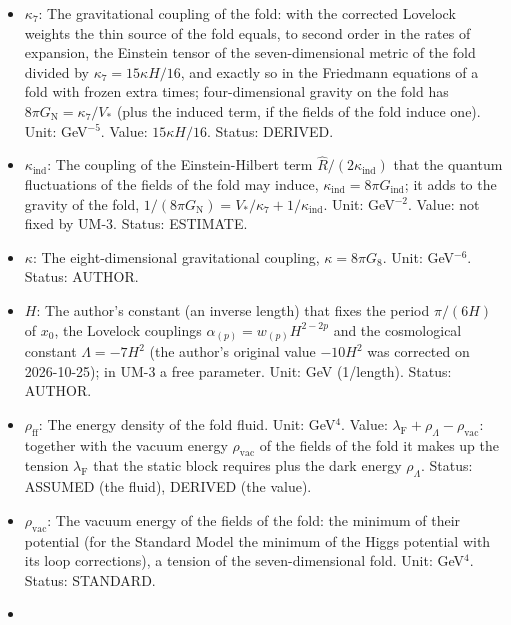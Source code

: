\documentclass[
  10pt,
]{article}
\begin{document}
\begin{itemize}
  \(\mathrm{e}^{-a_4}b_4\) is constant; it converts the
  eight-dimensional normalisation into the four-dimensional one. Unit:
  length\(^3\) (GeV\(^{-3}\)). Status: ASSUMED.
\item
  \(\kappa_7\): The gravitational coupling of the fold: with the
  corrected Lovelock weights the thin source of the fold equals, to
  second order in the rates of expansion, the Einstein tensor of the
  seven-dimensional metric of the fold divided by
  \(\kappa_7 = 15\kappa H/16\), and exactly so in the Friedmann
  equations of a fold with frozen extra times; four-dimensional gravity
  on the fold has \(8\pi G_{\mathrm{N}} = \kappa_7/V_*\) (plus the
  induced term, if the fields of the fold induce one). Unit:
  GeV\(^{-5}\). Value: \(15\kappa H/16\). Status: DERIVED.
\item
  \(\kappa_{\mathrm{ind}}\): The coupling of the Einstein-Hilbert term
  \(\hat R/(2\kappa_{\mathrm{ind}})\) that the quantum fluctuations of
  the fields of the fold may induce,
  \(\kappa_{\mathrm{ind}} = 8\pi G_{\mathrm{ind}}\); it adds to the
  gravity of the fold,
  \(1/(8\pi G_{\mathrm{N}}) = V_*/\kappa_7 + 1/\kappa_{\mathrm{ind}}\).
  Unit: GeV\(^{-2}\). Value: not fixed by UM-3. Status: ESTIMATE.
\item
  \(\kappa\): The eight-dimensional gravitational coupling,
  \(\kappa = 8\pi G_8\). Unit: GeV\(^{-6}\). Status: AUTHOR.
\item
  \(H\): The author's constant (an inverse length) that fixes the period
  \(\pi/(6H)\) of \(x_0\), the Lovelock couplings
  \(\alpha_{(p)} = w_{(p)}H^{2-2p}\) and the cosmological constant
  \(\Lambda = -7H^2\) (the author's original value \(-10H^2\) was
  corrected on 2026-10-25); in UM-3 a free parameter. Unit: GeV
  (1/length). Status: AUTHOR.
\item
  \(\rho_{\mathrm{ff}}\): The energy density of the fold fluid. Unit:
  GeV\(^4\). Value:
  \(\lambda_{\mathrm{F}} + \rho_\Lambda - \rho_{\mathrm{vac}}\):
  together with the vacuum energy \(\rho_{\mathrm{vac}}\) of the fields
  of the fold it makes up the tension \(\lambda_{\mathrm{F}}\) that the
  static block requires plus the dark energy \(\rho_\Lambda\). Status:
  ASSUMED (the fluid), DERIVED (the value).
\item
  \(\rho_{\mathrm{vac}}\): The vacuum energy of the fields of the fold:
  the minimum of their potential (for the Standard Model the minimum of
  the Higgs potential with its loop corrections), a tension of the
  seven-dimensional fold. Unit: GeV\(^4\). Status: STANDARD.
\item

\end{itemize}
\end{document}
